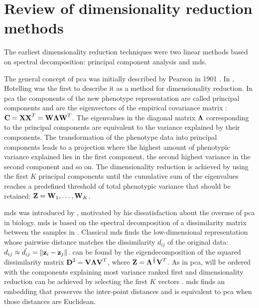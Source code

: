 \section{Review of dimensionality reduction methods}
\label{section:DimReduction-methods}
The earliest dimensionality reduction techniques were two linear methods based on spectral decomposition: principal component analysis and \gls{mds}. 

The general concept of \gls{pca} was initially described by Pearson in 1901 \citep{Pearson1901}. In  \parencite*{Hotelling1933}, Hotelling was the first to describe it as a method for dimensionality reduction. In \gls{pca} the components of the new phenotype representation are called principal components and are the eigenvectors  of the empirical covariance matrix :  \(\boldsymbol{\mathbf{C}}=\boldsymbol{\mathbf{X}}\boldsymbol{\mathbf{X}}^T = \boldsymbol{\mathbf{W}}\boldsymbol{\mathbf{\Lambda}}\boldsymbol{\mathbf{W}}^T\). The eigenvalues in the diagonal matrix \(\boldsymbol{\mathbf{\Lambda}}\) corresponding to the principal components are equivalent to the variance explained by their components. The transformation of the phenotype data into principal components leads to a projection where the highest amount of phenotypic variance explained lies in the first component, the second highest variance in the second component and so on. The dimensionality reduction is achieved by using the first \(K\) principal components until the cumulative sum of the eigenvalues reaches a predefined threshold of total phenotypic variance that should be retained: \(\boldsymbol{\mathbf{Z}}={\boldsymbol{\mathbf{W}}_{1}, \dots, \boldsymbol{\mathbf{W}}_{K}}\). 
 
\gls{mds} was introduced by \citet{Gower1966}, motivated by his dissatisfaction about the overuse of \gls{pca} in biology. \gls{mds} is based on the spectral decomposition of a dissimilarity matrix  between the samples in . Classical \gls{mds} finds the low-dimensional representation  whose pairwise distance matches the dissimilarity \(d_{ij}\) of the original data: \(d_{ij} \approx \hat{d_{ij}} = \lVert \boldsymbol{\mathbf{z}}_{i} - \boldsymbol{\mathbf{z}}_{j}\rVert \).  can be found by the eigendecomposition of the squared dissimilarity matrix \(\boldsymbol{\mathbf{D}}^\text{2} = \boldsymbol{\mathbf{V}}\boldsymbol{\mathbf{\Lambda}}\boldsymbol{\mathbf{V}}^\text{T}\), where \(\boldsymbol{\mathbf{Z}}=\boldsymbol{\mathbf{\Lambda}}^\frac{1}{2}\boldsymbol{\mathbf{V}}^T\). As in \gls{pca},  will be ordered with the components explaining most variance ranked first and dimensionality reduction can be achieved by selecting the first \(K\) vectors \citep{Gower1966}. \gls{mds} finds an embedding that preserves the inter‐point distances and is equivalent to \gls{pca} when those distances are Euclidean.


